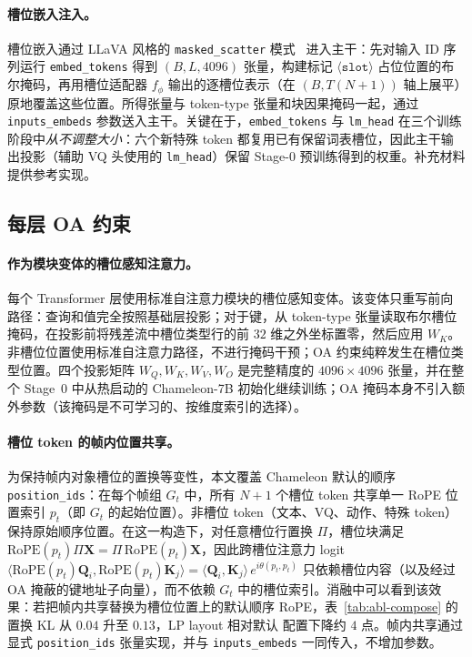 \paragraph{槽位嵌入注入。}
槽位嵌入通过 LLaVA 风格的 \texttt{masked\_scatter} 模式~\citep{llava,idefics2} 进入主干：先对输入 ID 序列运行 \texttt{embed\_tokens} 得到 $(B,L,4096)$ 张量，构建标记 $\langle\texttt{slot}\rangle$ 占位位置的布尔掩码，再用槽位适配器 $f_\phi$ 输出的逐槽位表示（在 $(B,T(N{+}1))$ 轴上展平）原地覆盖这些位置。所得张量与 token-type 张量和块因果掩码一起，通过 \texttt{inputs\_embeds} 参数送入主干。关键在于，\texttt{embed\_tokens} 与 \texttt{lm\_head} 在三个训练阶段中\emph{从不调整大小}：六个新特殊 token 都复用已有保留词表槽位，因此主干输出投影（辅助 VQ 头使用的 \texttt{lm\_head}）保留 Stage-0 预训练得到的权重。补充材料提供参考实现。

\subsection*{每层 OA 约束}

\paragraph{作为模块变体的槽位感知注意力。}
每个 Transformer 层使用标准自注意力模块的槽位感知变体。该变体只重写前向路径：查询和值完全按照基础层投影；对于键，从 token-type 张量读取布尔槽位掩码，在投影前将残差流中槽位类型行的前 $32$ 维之外坐标置零，然后应用 $W_K$。非槽位位置使用标准自注意力路径，不进行掩码干预；OA 约束纯粹发生在槽位类型位置。四个投影矩阵 $W_Q, W_K, W_V, W_O$ 是完整精度的 $4096\!\times\!4096$ 张量，并在整个 Stage~0 中从热启动的 Chameleon-7B 初始化继续训练；OA 掩码本身不引入额外参数（该掩码是不可学习的、按维度索引的选择）。

\paragraph{槽位 token 的帧内位置共享。}
为保持帧内对象槽位的置换等变性，本文覆盖 Chameleon 默认的顺序 \texttt{position\_ids}：在每个帧组 $G_t$ 中，所有 $N{+}1$ 个槽位 token 共享单一 RoPE 位置索引 $p_t$（即 $G_t$ 的起始位置）。非槽位 token（文本、VQ、动作、特殊 token）保持原始顺序位置。在这一构造下，对任意槽位行置换 $\Pi$，槽位块满足 $\mathrm{RoPE}(p_t)\Pi\mathbf{X}\!=\!\Pi\,\mathrm{RoPE}(p_t)\mathbf{X}$，因此跨槽位注意力 logit $\langle\mathrm{RoPE}(p_t)\mathbf{Q}_i,\mathrm{RoPE}(p_t)\mathbf{K}_j\rangle\!=\!\langle\mathbf{Q}_i,\mathbf{K}_j\rangle\,e^{i\theta(p_t,p_t)}$ 只依赖槽位内容（以及经过 OA 掩蔽的键地址子向量），而不依赖 $G_t$ 中的槽位索引。消融中可以看到该效果：若把帧内共享替换为槽位位置上的默认顺序 RoPE，表~\ref{tab:abl-compose} 的置换 KL 从 $0.04$ 升至 $0.13$，LP layout 相对默认 \method{}配置下降约 $4$ 点。帧内共享通过显式 \texttt{position\_ids} 张量实现，并与 \texttt{inputs\_embeds} 一同传入，不增加参数。

